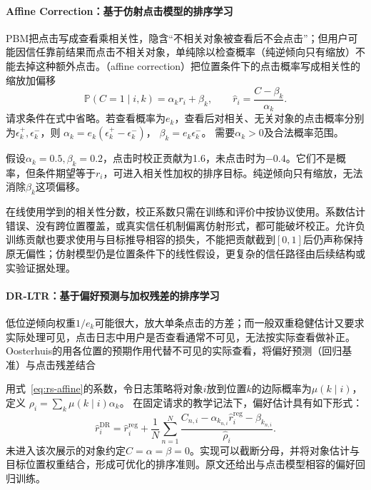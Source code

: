 \paragraph{Affine Correction：基于仿射点击模型的排序学习}
\label{sec:rs-affine-correction}

PBM把点击写成查看乘相关性，隐含“不相关对象被查看后不会点击”；但用户可能因信任靠前结果而点击不相关对象，单纯除以检查概率（纯逆倾向只有缩放）不能去掉这种额外点击。（affine correction）把位置条件下的点击概率写成相关性的缩放加偏移
\begin{equation}
 \mathbb P(C=1\mid i,k)=\alpha_k r_i+\beta_k,\qquad
 \widehat r_i=\frac{C-\beta_k}{\alpha_k}.
 \label{eq:rs-affine}
\end{equation}
请求条件在式中省略。若查看概率为$e_k$，查看后对相关、无关对象的点击概率分别为$\epsilon_k^+,\epsilon_k^-$，则
$\alpha_k=e_k(\epsilon_k^+-\epsilon_k^-)$，
$\beta_k=e_k\epsilon_k^-$。
需要$\alpha_k>0$及合法概率范围。

假设$\alpha_k=0.5,\beta_k=0.2$，点击时校正贡献为1.6，未点击时为$-0.4$。它们不是概率，但条件期望等于$r_i$，可进入相关性加权的排序目标。纯逆倾向只有缩放，无法消除$\beta_k$这项偏移。

在线使用学到的相关性分数，校正系数只需在训练和评价中按协议使用。系数估计错误、没有跨位置覆盖，或真实信任机制偏离仿射形式，都可能破坏校正。允许负训练贡献也要求使用与目标推导相容的损失，不能把贡献截到$[0,1]$后仍声称保持原无偏性；仿射模型仍是位置条件下的线性假设，更复杂的信任路径由后续结构或实验证据处理。

\paragraph{DR-LTR：基于偏好预测与加权残差的排序学习}
\label{sec:rs-dr-ltr}

低位逆倾向权重$1/e_k$可能很大，放大单条点击的方差；而一般双重稳健估计又要求实际处理可见，点击日志中用户是否查看通常不可见，无法按实际查看做补正。Oosterhuis的用各位置的预期作用代替不可见的实际查看，将偏好预测（回归基准）与点击残差结合

用式~\eqref{eq:rs-affine}的系数，令日志策略将对象$i$放到位置$k$的边际概率为$\mu(k\mid i)$，定义
$\rho_i=\sum_k\mu(k\mid i)\alpha_k$。
在固定请求的教学记法下，偏好估计具有如下形式：
\begin{equation}
 \widehat r_i^{\mathrm{DR}}
 =\widehat r_i^{\mathrm{reg}}
  +\frac1N\sum_{n=1}^{N}
   \frac{C_{n,i}-\alpha_{k_{n,i}}\widehat r_i^{\mathrm{reg}}
                     -\beta_{k_{n,i}}}
        {\widehat\rho_i}.
 \label{eq:rs-dr-ltr}
\end{equation}
未进入该次展示的对象约定$C=\alpha=\beta=0$。实现可以截断分母，并将对象估计与目标位置权重结合，形成可优化的排序准则。原文还给出与点击模型相容的偏好回归训练。

